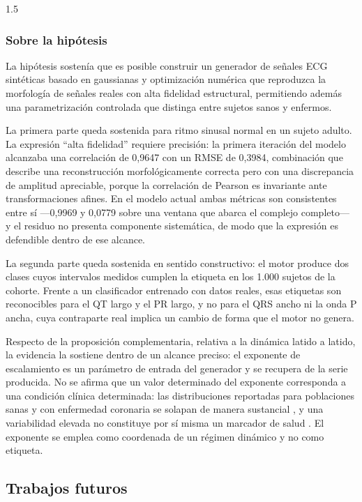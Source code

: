 \begin{spacing}{1.5}
\subsubsection{Sobre la hipótesis}

La hipótesis sostenía que es posible construir un generador de señales ECG sintéticas basado en gaussianas y optimización numérica que reproduzca la morfología de señales reales con alta fidelidad estructural, permitiendo además una parametrización controlada que distinga entre sujetos sanos y enfermos.

La primera parte queda sostenida para ritmo sinusal normal en un sujeto adulto. La expresión ``alta fidelidad'' requiere precisión: la primera iteración del modelo alcanzaba una correlación de 0,9647 con un RMSE de 0,3984, combinación que describe una reconstrucción morfológicamente correcta pero con una discrepancia de amplitud apreciable, porque la correlación de Pearson es invariante ante transformaciones afines. En el modelo actual ambas métricas son consistentes entre sí ---0,9969 y 0,0779 sobre una ventana que abarca el complejo completo--- y el residuo no presenta componente sistemática, de modo que la expresión es defendible dentro de ese alcance.

La segunda parte queda sostenida en sentido constructivo: el motor produce dos clases cuyos intervalos medidos cumplen la etiqueta en los 1.000 sujetos de la cohorte. Frente a un clasificador entrenado con datos reales, esas etiquetas son reconocibles para el QT largo y el PR largo, y no para el QRS ancho ni la onda P ancha, cuya contraparte real implica un cambio de forma que el motor no genera.

Respecto de la proposición complementaria, relativa a la dinámica latido a latido, la evidencia la sostiene dentro de un alcance preciso: el exponente de escalamiento es un parámetro de entrada del generador y se recupera de la serie producida. No se afirma que un valor determinado del exponente corresponda a una condición clínica determinada: las distribuciones reportadas para poblaciones sanas y con enfermedad coronaria se solapan de manera sustancial \cite{costa2017fragmentation}, y una variabilidad elevada no constituye por sí misma un marcador de salud \cite{shaffer2017overview}. El exponente se emplea como coordenada de un régimen dinámico y no como etiqueta.

\subsection{Trabajos futuros}


\end{spacing}
